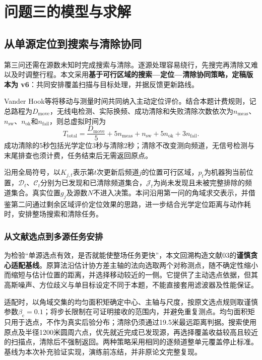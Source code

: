 \section{问题三的模型与求解}
\label{sec:q3}

\subsection{从单源定位到搜索与清除协同}

第三问还需在源数未知时完成搜索与清除。逐源处理容易绕行，先搜完再清除又难以及时调整行程。本文采用\textbf{基于可行区域的搜索—定位—清除协同策略，定稿版本为 v6}：共同安排覆盖扫描与目标处理，并据反馈更新路线。

Vander Hook等将移动与测量时间共同纳入主动定位评价\cite{VanderHook2014}。结合本题计费规则，记总路程为$D_{\mathrm{move}}$，无线电检测、实际换频、成功清除和失败清除次数依次为$n_{\mathrm{meas}}$、$n_{\mathrm{sw}}$、$n_{\mathrm{ok}}$和$n_{\mathrm{fail}}$，则总虚拟时间为
\begin{equation}
T_{\mathrm{total}}=\frac{D_{\mathrm{move}}}{5}+5n_{\mathrm{meas}}+n_{\mathrm{sw}}
                     +5n_{\mathrm{ok}}+3n_{\mathrm{fail}}.
\label{eq:q3-cost}
\end{equation}
成功清除的5秒包括光学定位3秒与清除2秒；清除不改变测向频道，无信号检测与末尾排查也须计费，任务结束后无需返回原点。

沿用全局符号，以$K_{j,t}$表示第$t$次更新后频道$j$的位置可行区域，$p_t$为机器狗当前位置，$\mathcal D_t$、$\mathcal C_t$分别为已发现和已清除频道集合，$\mathcal J_t$为尚未发现且未被完整排除的频道集合。真实位置$g_j$及源数$N$不进入决策。本问沿用第一问的角域求交表示，并借鉴第二问通过剩余区域评价定位效果的思路，进一步结合光学定位距离与动作耗时，安排整场搜索和清除任务。


\subsubsection{从文献选点到多源任务安排}

为检验“单源选点有效，是否就能使整场任务更快”，本文回溯构造文献03的\textbf{谨慎贪心适配基线}。原算法沿估计协方差主轴的法向选取两个对称测点，随不确定性缩小而缩短与估计位置的距离，并选择移动较近的一侧\cite{VanderHook2014}。它提供了主动选点依据，但其高斯噪声、方位歧义与单目标设定不同于本题，不能直接套用滤波器及性能保证。

适配时，以角域交集的均匀面积矩确定中心、主轴与尺度，按原文选点规则取谨慎参数$\beta_{\mathrm c}=0.1$；将步长限制在可证明接收的范围内，并避免重复测点。均匀面积矩只用于选点，不作为真实后验分布；清除仍须通过19.5米最远距离判据。搜索使用原点及半径1200米圆周六点，优先就近完成已发现源，再选择覆盖收益较高且较近的扫描点，清除后不强制返回。两种策略采用相同的逐频道整单元覆盖停止标准。基线为本次补充验证实现，演练前冻结，并非原论文完整复现。

